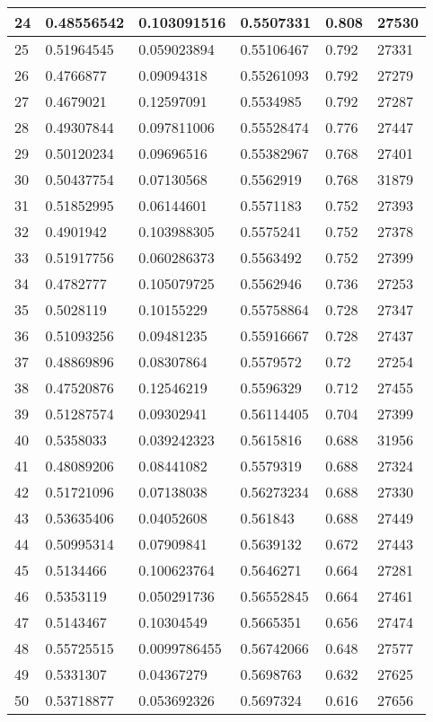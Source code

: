 \begin{longtable}{|l|l|l|l|l|l|}
24 & 0.48556542 & 0.103091516 & 0.5507331 & 0.808 & 27530 \\ \hline 
25 & 0.51964545 & 0.059023894 & 0.55106467 & 0.792 & 27331 \\ \hline 
26 & 0.4766877 & 0.09094318 & 0.55261093 & 0.792 & 27279 \\ \hline 
27 & 0.4679021 & 0.12597091 & 0.5534985 & 0.792 & 27287 \\ \hline 
28 & 0.49307844 & 0.097811006 & 0.55528474 & 0.776 & 27447 \\ \hline 
29 & 0.50120234 & 0.09696516 & 0.55382967 & 0.768 & 27401 \\ \hline 
30 & 0.50437754 & 0.07130568 & 0.5562919 & 0.768 & 31879 \\ \hline 
31 & 0.51852995 & 0.06144601 & 0.5571183 & 0.752 & 27393 \\ \hline 
32 & 0.4901942 & 0.103988305 & 0.5575241 & 0.752 & 27378 \\ \hline 
33 & 0.51917756 & 0.060286373 & 0.5563492 & 0.752 & 27399 \\ \hline 
34 & 0.4782777 & 0.105079725 & 0.5562946 & 0.736 & 27253 \\ \hline 
35 & 0.5028119 & 0.10155229 & 0.55758864 & 0.728 & 27347 \\ \hline 
36 & 0.51093256 & 0.09481235 & 0.55916667 & 0.728 & 27437 \\ \hline 
37 & 0.48869896 & 0.08307864 & 0.5579572 & 0.72 & 27254 \\ \hline 
38 & 0.47520876 & 0.12546219 & 0.5596329 & 0.712 & 27455 \\ \hline 
39 & 0.51287574 & 0.09302941 & 0.56114405 & 0.704 & 27399 \\ \hline 
40 & 0.5358033 & 0.039242323 & 0.5615816 & 0.688 & 31956 \\ \hline 
41 & 0.48089206 & 0.08441082 & 0.5579319 & 0.688 & 27324 \\ \hline 
42 & 0.51721096 & 0.07138038 & 0.56273234 & 0.688 & 27330 \\ \hline 
43 & 0.53635406 & 0.04052608 & 0.561843 & 0.688 & 27449 \\ \hline 
44 & 0.50995314 & 0.07909841 & 0.5639132 & 0.672 & 27443 \\ \hline 
45 & 0.5134466 & 0.100623764 & 0.5646271 & 0.664 & 27281 \\ \hline 
46 & 0.5353119 & 0.050291736 & 0.56552845 & 0.664 & 27461 \\ \hline 
47 & 0.5143467 & 0.10304549 & 0.5665351 & 0.656 & 27474 \\ \hline 
48 & 0.55725515 & 0.0099786455 & 0.56742066 & 0.648 & 27577 \\ \hline 
49 & 0.5331307 & 0.04367279 & 0.5698763 & 0.632 & 27625 \\ \hline 
50 & 0.53718877 & 0.053692326 & 0.5697324 & 0.616 & 27656 \\ \hline 
\end{longtable}
